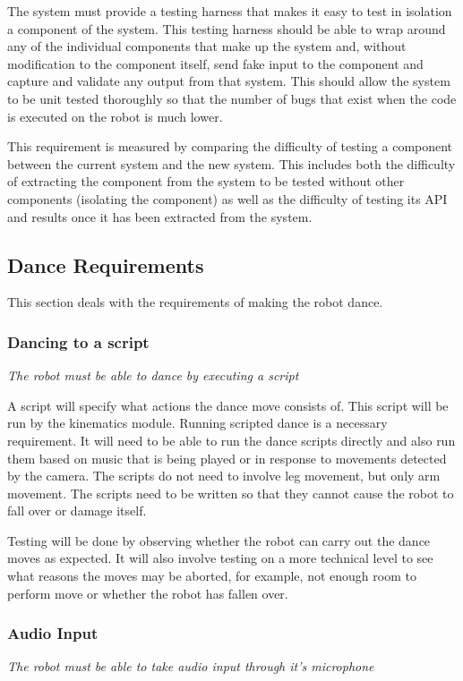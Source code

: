 \documentclass[english,12pt]{scrartcl}
\newcommand{\requirement}[1]{\textit{#1}}
\begin{document}
				The system must provide a testing harness that makes it easy to test in isolation a
				component of the system. This testing harness should be able to wrap around any of the
				individual components that make up the system and, without modification to the component
				itself, send fake input to the component and capture and validate any output from that
				system. This should allow the system to be unit tested thoroughly so that the number
				of bugs that exist when the code is executed on the robot is much lower.

				This requirement is measured by comparing the difficulty of testing a component between
				the current system and the new system. This includes both the difficulty of extracting
				the component from the system to be tested without other components (isolating the
				component) as well as the difficulty of testing its API and results once it has been
				extracted from the system.
		\subsection{Dance Requirements}
		This section deals with the requirements of making the robot dance.
			\subsubsection{Dancing to a script}
				\requirement{The robot must be able to dance by executing a script}

				A script will specify what actions the dance move consists of.
				This script will be run by the kinematics module. Running scripted dance is a necessary requirement.
				It will need to be able to run the dance scripts directly and also run them based on music that is being played or in response to movements detected by the camera.
				The scripts do not need to involve leg movement, but only arm movement.
				The scripts need to be written so that they cannot cause the robot to fall over or damage itself.

				Testing will be done by observing whether the robot can carry out the dance moves as expected.
				It will also involve testing on a more technical level to see what reasons the moves may be aborted, for example, not enough room to perform move or whether the robot has fallen over.

			\subsubsection{Audio Input}
				\requirement{The robot must be able to take audio input through it's microphone}
\end{document}
